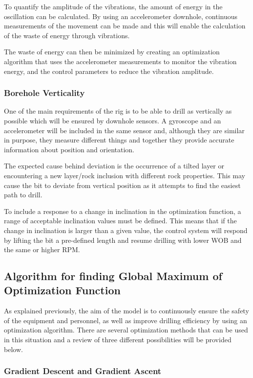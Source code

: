To quantify the amplitude of the vibrations, the amount of energy in the oscillation can be calculated. By using an accelerometer downhole, continuous measurements of the movement can be made and this will enable the calculation of the waste of energy through vibrations. 

The waste of energy can then be minimized by creating an optimization algorithm that uses the accelerometer measurements to monitor the vibration energy, and the control parameters to reduce the vibration amplitude.

\subsubsection{Borehole Verticality}

One of the main requirements of the rig is to be able to drill as vertically as possible which will be ensured by downhole sensors. A gyroscope and an accelerometer will be included in the same sensor and, although they are similar in purpose, they measure different things and together they provide accurate information about position and orientation.

The expected cause behind deviation is the occurrence of a tilted layer or encountering a new layer/rock inclusion with different rock properties. This may cause the bit to deviate from vertical position as it attempts to find the easiest path to drill.

To include a response to a change in inclination in the optimization function, a range of acceptable inclination values must be defined. This means that if the change in inclination is larger than a given value, the control system will respond by lifting the bit a pre-defined length and resume drilling with lower WOB and the same or higher RPM.


\subsection{Algorithm for finding Global Maximum of Optimization Function}

As explained previously, the aim of the model is to continuously ensure the safety of the equipment and personnel, as well as improve drilling efficiency by using an optimization algorithm. There are several optimization methods that can be used in this situation and a review of three different possibilities will be provided below.

\subsubsection{Gradient Descent and Gradient Ascent}


